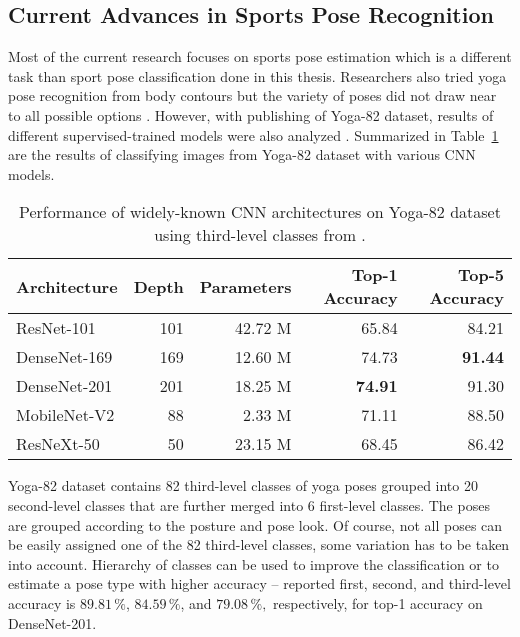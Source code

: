 \subsection{Current Advances in Sports Pose Recognition}

Most of the current research focuses on sports pose estimation which is a different task than sport pose classification done in this thesis. Researchers also tried yoga pose recognition from body contours but the variety of poses did not draw near to all possible options \cite{yoga-posture-recognition}. However, with publishing of Yoga-82 dataset, results of different supervised-trained models were also analyzed \cite{verma2020yoga}. Summarized in Table~\ref{tab:yoga82-results} are the results of classifying images from Yoga-82 dataset with various CNN models.

\begin{table}[ht]
    \centering
    \begin{tabular}{l r r r r}
        \hline
        Architecture & Depth & Parameters & Top-1 Accuracy & Top-5 Accuracy \\
        \hline
        ResNet-101 & 101 & 42.72 M & 65.84 & 84.21 \\
        DenseNet-169 & 169 & 12.60 M & 74.73 & \textbf{91.44} \\
        DenseNet-201 & 201 & 18.25 M & \textbf{74.91} & 91.30 \\
        MobileNet-V2 & 88 & 2.33 M & 71.11 & 88.50 \\
        ResNeXt-50 & 50 & 23.15 M & 68.45 & 86.42 \\
        \hline
    \end{tabular}
    \caption{Performance of widely-known CNN architectures on Yoga-82 dataset using third-level classes from \cite{verma2020yoga}.}
    \label{tab:yoga82-results}
\end{table}

Yoga-82 dataset contains 82 third-level classes of yoga poses grouped into 20 second-level classes that are further merged into 6 first-level classes. The poses are grouped according to the posture and pose look. Of course, not all poses can be easily assigned one of the 82 third-level classes, some variation has to be taken into account. Hierarchy of classes can be used to improve the classification or to estimate a pose type with higher accuracy -- reported first, second, and third-level accuracy is $89.81\,\%$, $84.59\,\%$, and $79.08\,\%,$ respectively, for top-1 accuracy on DenseNet-201.

